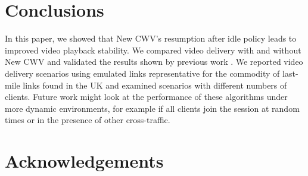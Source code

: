 \documentclass[10pt,sigconf]{acmart}
\begin{document}
%
% 



\section{Conclusions}


In this paper, we showed that New CWV's resumption after idle policy leads to improved video playback stability. We compared video delivery with and without New CWV and validated the results shown by previous work \cite{Nazir-2014-performance-evaluation-congestion-window-validation-dash-newcwv}. We reported video delivery scenarios using emulated links representative for the commodity of last-mile links found in the UK and examined scenarios with different numbers of clients. Future work might look at the performance of these algorithms under more dynamic environments, for example if all clients join the session at random times or in the presence of other cross-traffic. 



\section{Acknowledgements}


%
\end{document}
